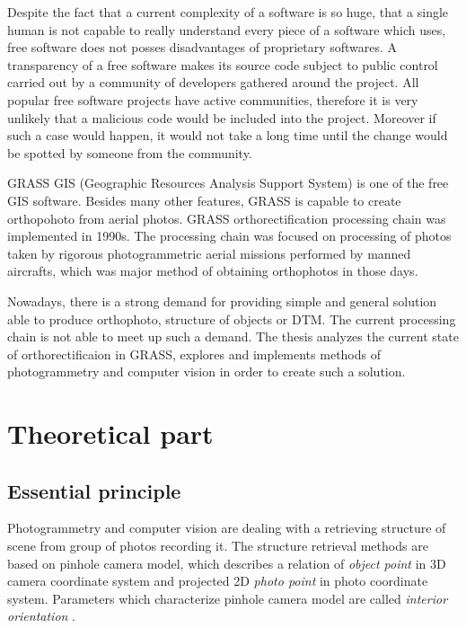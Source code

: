 \documentclass[a4paper,12pt]{article}
\newcommand{\term}[1]{
{\it #1}%
}
\begin{document}

Despite the fact that a current complexity of a software is so huge,
that a single human is not capable to really understand every piece of a software which uses,
free software does not posses disadvantages of proprietary softwares.
A transparency of a free software makes its source code subject to public control 
carried out by a community of developers gathered around the project.
All popular free software projects have active communities, therefore it is
very unlikely that a malicious code would be included into the project.
Moreover if such a case would happen, it would not take a long time until the change 
would be spotted by someone from the community.

GRASS GIS  (Geographic Resources Analysis Support System) \cite{neteler2012grass}
is one of the free GIS software. 
Besides many other features, GRASS is capable to create orthopohoto from aerial photos.
GRASS orthorectification processing chain was implemented in 1990s.
The processing chain was focused on  processing of photos taken by rigorous 
photogrammetric aerial missions performed by manned aircrafts, which was 
major method of obtaining orthophotos in those days. 

Nowadays, there is a strong demand for  providing simple and general solution 
 able to produce orthophoto, structure of objects or 
DTM. The current processing chain is not able to meet up such a demand.
 The thesis analyzes the current state of orthorectificaion in GRASS,
explores and implements methods of photogrammetry and computer vision in order 
to create such a solution.

\section{Theoretical part}


\subsection{Essential principle}
\label{sec:ess_princip}

Photogrammetry and computer vision are dealing with  a retrieving structure of scene from group of photos 
 recording it. The structure retrieval methods are based on pinhole camera model, which 
describes a relation of \term{object point} in 
3D camera coordinate system and projected 2D \term{photo point} in photo coordinate system.
Parameters which characterize pinhole camera model are called \term{interior orientation}.
\end{document}
